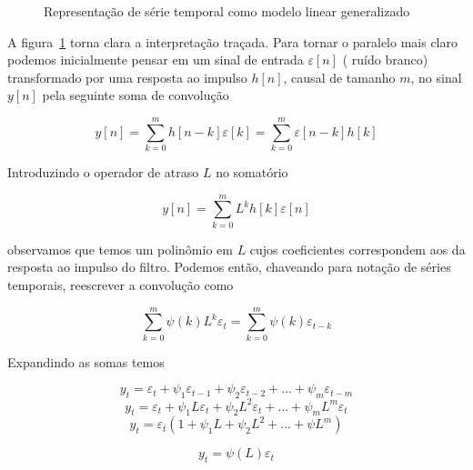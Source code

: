 \begin{figure}
    \centering
    \vspace{.6cm}
    \caption{Representação de série temporal como modelo linear generalizado}
    \label{fig:white_noise_LTI}
\end{figure}


A figura~\ref{fig:white_noise_LTI} torna clara a interpretação traçada. Para
tornar o paralelo mais claro podemos inicialmente pensar em um sinal de entrada
$\varepsilon[n]$ ( ruído branco) transformado por uma resposta ao impulso
$h[n]$, causal de tamanho $m$, no sinal $y[n]$ pela seguinte soma de convolução

$$ y[n] = \sum^{m}_{k=0} h[n-k]\varepsilon[k] =  \sum^{m}_{k=0} \varepsilon[n-k]h[k]$$

Introduzindo o operador de atraso $L$ no somatório

$$ y[n] = \sum^{m}_{k=0} L^{k}h[k] \varepsilon[n]$$

observamos que temos um polinômio em $L$ cujos coeficientes correspondem aos
da resposta ao impulso do filtro. Podemos então, chaveando para notação de
séries temporais, reescrever a convolução como

$$ \sum^{m}_{k=0} \psi(k)L^k\varepsilon_{t} = \sum^{m}_{k=0} \psi(k)\varepsilon_{t-k}$$

Expandindo as somas temos

$$ y_t = \varepsilon_t + \psi_1 \varepsilon_{t-1} + \psi_2 \varepsilon_{t-2} + ... +  \psi_m \varepsilon_{t-m}$$
$$ y_t = \varepsilon_t + \psi_1 L\varepsilon_{t} + \psi_2 L^2 \varepsilon_{t} + ... +  \psi_m L^m \varepsilon_{t}$$
$$ y_t = \varepsilon_t(1 + \psi_1 L + \psi_2 L^2 + ... + \psi L^m)$$

\begin{equation}\label{eq:fir}
    y_t = \psi(L)\varepsilon_t
\end{equation}

